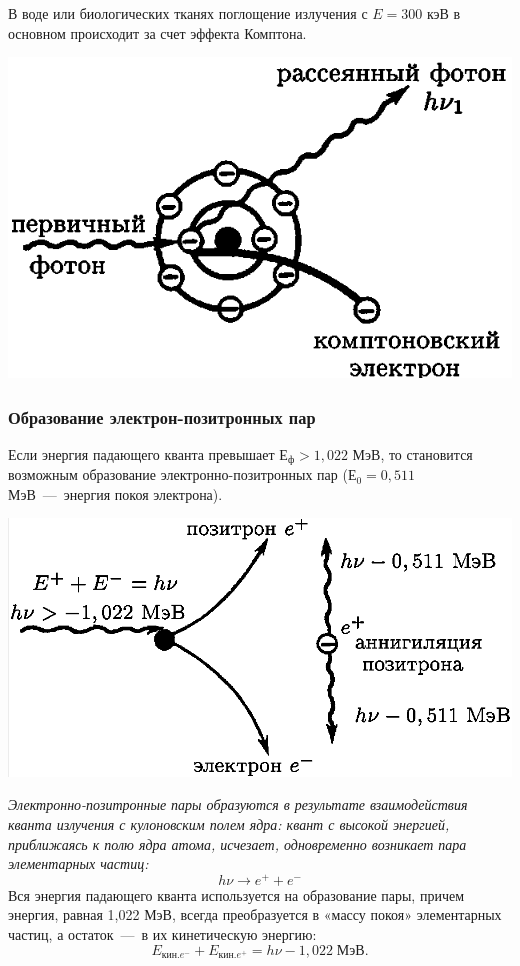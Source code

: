 \documentclass[a4paper, 14pt]{article}
\begin{document}
В воде или биологических тканях поглощение излучения с $E=300$ кэВ в основном происходит за счет эффекта Комптона.

\includegraphics[width=.5\textwidth]{ComptonScattering.png}

\subsubsection{Образование электрон-позитронных пар}
Если энергия падающего кванта превышает $Е_\text{ф}>1,022$ МэВ, то становится возможным образование электронно-позитронных пар ($Е_0=0,511$ МэВ~---~энергия покоя электрона). 

\includegraphics[width=.5\textwidth]{elPosCouple.png}

\textit{Электронно-позитронные пары образуются в результате взаимодействия кванта излучения с кулоновским полем ядра: квант с высокой энергией, приближаясь к полю ядра атома, исчезает, одновременно возникает пара элементарных частиц:} 
\[ h\nu \rightarrow e^{+} + e^{-}\]
Вся энергия падающего кванта используется на образование пары, причем энергия, равная 1,022 МэВ, всегда преобразуется в «массу покоя» элементарных частиц, а остаток~---~в их кинетическую энергию:
\[E_{\text{кин.}e^{-}}+E_{\text{кин.}e^{+}} = h\nu - 1,022\;\text{МэВ}.\]
\end{document}
